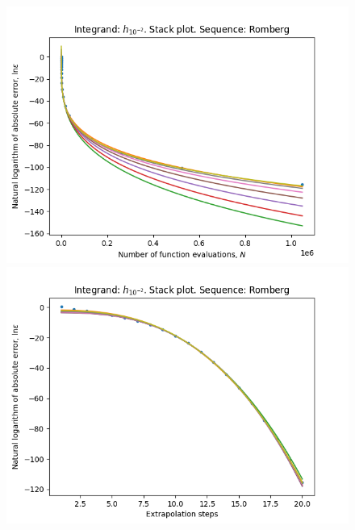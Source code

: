 \begin{figure}[H]
\centering
\begin{minipage}{0.45\textwidth}
\centering
\includegraphics[scale=0.45]{../results/romberg_plots/h_hundredth_hp_romberg_stack.png}
\end{minipage}
\begin{minipage}{0.45\textwidth}
\centering
\includegraphics[scale=0.45]{../results/romberg_plots/h_hundredth_hp_romberg_steps_stack.png}
\end{minipage}
\end{figure}

